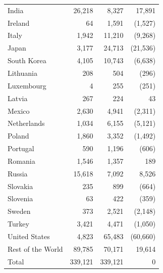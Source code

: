 \documentclass[a4paper,12pt]{article}
\begin{document}
\begin{table}
\begin{center}
\begin{tabular}{lrrr}
India &  26,218  &  8,327  & 17,891 \\ 
Ireland &  64  &  1,591  & (1,527)\\ 
Italy &  1,942  &  11,210  & (9,268)\\ 
Japan &  3,177  &  24,713  & (21,536)\\ 
South Korea &  4,105  &  10,743  & (6,638)\\ 
Lithuania &  208  &  504  & (296)\\ 
Luxembourg &  4  &  255  & (251)\\ 
Latvia &  267  &  224  & 43 \\ 
Mexico &  2,630  &  4,941  & (2,311)\\ 
Netherlands &  1,034  &  6,155  & (5,121)\\ 
Poland &  1,860  &  3,352  & (1,492)\\ 
Portugal &  590  &  1,196  & (606)\\ 
Romania &  1,546  &  1,357  & 189 \\ 
Russia &  15,618  &  7,092  & 8,526 \\ 
Slovakia &  235  &  899  & (664)\\ 
Slovenia &  63  &  422  & (359)\\ 
Sweden &  373  &  2,521  & (2,148)\\ 
Turkey &  3,421  &  4,471  & (1,050)\\ 
United States &  4,823  &  65,483  & (60,660)\\ 
Rest of the World &  89,785  &  70,171  & 19,614   \\
\hline 
Total & 339,121 & 339,121 & 0 \\
\hline
\end{tabular}
\label{tab05} 
\end{center}
\end{table}
\end{document}
